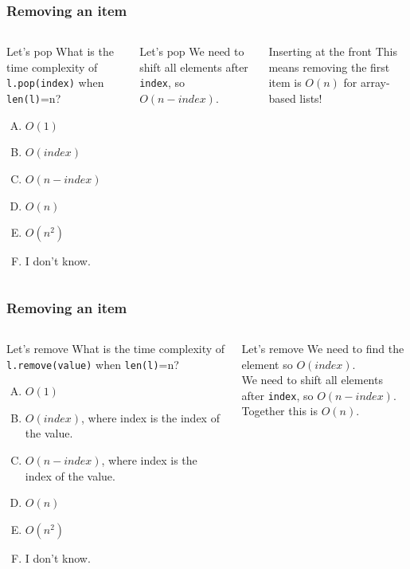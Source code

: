 \begin{frame}
	\frametitle{Removing an item}
	\begin{columns}
		\begin{block}{Let's pop}
			What is the time complexity of \texttt{l.pop(index)} when \texttt{len(l)}=n?
			\begin{enumerate}[A.]
				\item $O(1)$
				\item $O(\textit{index})$
				\item $O(n - \textit{index})$
				\item $O(n)$
				\item $O(n^2)$
				\item I don't know.
			\end{enumerate}
		\end{block}
		\pause
		\begin{block}{Let's pop}
			We need to shift all elements after \texttt{index}, so $O(n-\textit{index})$.
		\end{block}
		\pause
		\begin{block}{Inserting at the front}
			This means removing the first item is $O(n)$ for array-based lists!
		\end{block}	
	\end{columns}
\end{frame}

\begin{frame}
	\frametitle{Removing an item}
	\begin{columns}
		\column{0.455\textwidth}
		\begin{block}{Let's remove}
			What is the time complexity of \texttt{l.remove(value)} when \texttt{len(l)}=n?
			\begin{enumerate}[A.]
				\item $O(1)$
				\item $O(\textit{index})$, where index is the index of the value.
				\item $O(n - \textit{index})$, where index is the index of the value.
				\item $O(n)$
				\item $O(n^2)$
				\item I don't know.
			\end{enumerate}
		\end{block}
		\pause
		\column{0.455\textwidth}
		\begin{block}{Let's remove}
			We need to find the element so $O(\textit{index})$.\\
			We need to shift all elements after \texttt{index}, so $O(n-\textit{index})$.\\
			Together this is $O(n)$.
		\end{block}
	\end{columns}
\end{frame}

